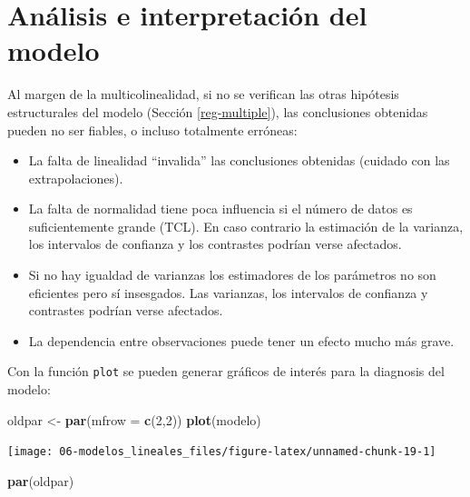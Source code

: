 \documentclass[
]{book}
\newenvironment{Shaded}{\begin{snugshade}}{\end{snugshade}}
\newcommand{\DataTypeTok}[1]{\textcolor[rgb]{0.13,0.29,0.53}{#1}}
\newcommand{\DecValTok}[1]{\textcolor[rgb]{0.00,0.00,0.81}{#1}}
\newcommand{\KeywordTok}[1]{\textcolor[rgb]{0.13,0.29,0.53}{\textbf{#1}}}
\newcommand{\NormalTok}[1]{#1}
\newcommand{\StringTok}[1]{\textcolor[rgb]{0.31,0.60,0.02}{#1}}
\theoremstyle{break}
\theoremstyle{definition}
\theoremstyle{definition}
\theoremstyle{definition}
\theoremstyle{remark}
\begin{document}
\hypertarget{analisis-reg-multiple}{%
\section{Análisis e interpretación del modelo}\label{analisis-reg-multiple}}

Al margen de la multicolinealidad, si no se verifican las otras hipótesis estructurales del modelo (Sección \ref{reg-multiple}), las conclusiones obtenidas pueden no ser fiables, o incluso totalmente erróneas:

\begin{itemize}
\item
  La falta de linealidad ``invalida'' las conclusiones obtenidas
  (cuidado con las extrapolaciones).
\item
  La falta de normalidad tiene poca influencia si el
  número de datos es suficientemente grande (TCL). En caso contrario
  la estimación de la varianza, los intervalos de confianza y los
  contrastes podrían verse afectados.
\item
  Si no hay igualdad de varianzas los estimadores de los
  parámetros no son eficientes pero sí insesgados. Las varianzas, los
  intervalos de confianza y contrastes podrían verse afectados.
\item
  La dependencia entre observaciones puede tener un efecto mucho
  más grave.
\end{itemize}

Con la función \texttt{plot} se pueden generar gráficos de interés para la diagnosis del modelo:

\begin{Shaded}
\begin{Highlighting}[]
\NormalTok{oldpar <-}\StringTok{ }\KeywordTok{par}\NormalTok{(}\DataTypeTok{mfrow =} \KeywordTok{c}\NormalTok{(}\DecValTok{2}\NormalTok{,}\DecValTok{2}\NormalTok{))}
\KeywordTok{plot}\NormalTok{(modelo)}
\end{Highlighting}
\end{Shaded}

\begin{center}\texttt{[image: 06-modelos\_lineales\_files/figure-latex/unnamed-chunk-19-1]} \end{center}

\begin{Shaded}
\begin{Highlighting}[]
\KeywordTok{par}\NormalTok{(oldpar)}
\end{Highlighting}
\end{Shaded}
\end{document}
